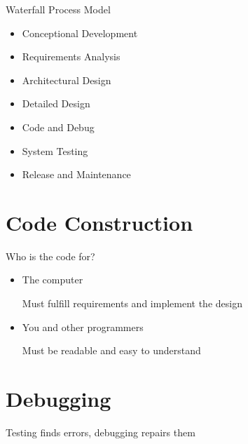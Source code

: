 \documentclass[12pt]{article}
\begin{document}
Waterfall Process Model
\begin{itemize}
    \item Conceptional Development
    \item Requirements Analysis
    \item Architectural Design
    \item Detailed Design
    \item Code and Debug
    \item System Testing 
    \item Release and Maintenance
\end{itemize}

\section{Code Construction}

Who is the code for?
\begin{itemize}
    \item The computer
    
    Must fulfill requirements and implement the design

    \item You and other programmers
    
    Must be readable and easy to understand 
\end{itemize}

\section{Debugging}

Testing finds errors, debugging repairs them
\end{document}
